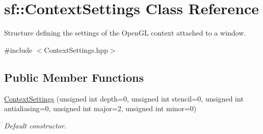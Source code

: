 \hypertarget{structsf_1_1ContextSettings}{\section{sf\-:\-:Context\-Settings Class Reference}
\label{structsf_1_1ContextSettings}
}


Structure defining the settings of the Open\-G\-L context attached to a window.  




{\ttfamily \#include $<$Context\-Settings.\-hpp$>$}

\subsection*{Public Member Functions}
\begin{DoxyCompactItemize}
\item 
\hyperlink{structsf_1_1ContextSettings_aafe35f8e257f9d1e496ed64e33e2ee9f}{Context\-Settings} (unsigned int depth=0, unsigned int stencil=0, unsigned int antialiasing=0, unsigned int major=2, unsigned int minor=0)
\begin{DoxyCompactList}\small\item\em Default constructor. \end{DoxyCompactList}\end{DoxyCompactItemize}
